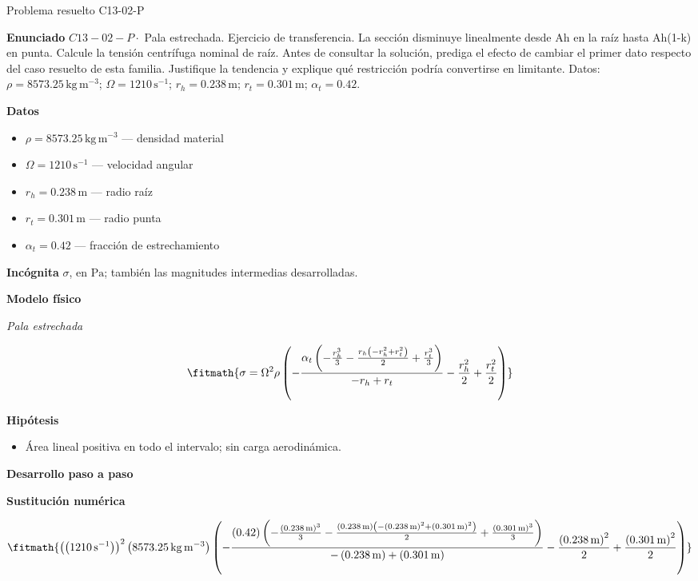 \documentclass[10pt,openany]{book}
\begin{document}
\begin{studiumworked}{Problema resuelto C13-02-P}


\noindent\textbf{Enunciado}
\(C13-02-P \cdot\) Pala estrechada. Ejercicio de transferencia. La sección disminuye linealmente desde Ah en la raíz hasta Ah(1-k) en punta. Calcule la tensión centrífuga nominal de raíz. Antes de consultar la solución, prediga el efecto de cambiar el primer dato respecto del caso resuelto de esta familia. Justifique la tendencia y explique qué restricción podría convertirse en limitante. Datos: \(\rho=8573.25\, \mathrm{kg}\,\mathrm{m}^{-3}\); \(\Omega=1210\, \mathrm{s}^{-1}\); \(r_h=0.238\, \mathrm{m}\); \(r_t=0.301\, \mathrm{m}\); \(\alpha_t=0.42\).

\noindent\textbf{Datos}
\begin{itemize}
\item $\rho = 8573.25\,\mathrm{kg}\,\mathrm{m}^{-3}$ — densidad material
\item $\Omega = 1210\,\mathrm{s}^{-1}$ — velocidad angular
\item $r_h = 0.238\,\mathrm{m}$ — radio raíz
\item $r_t = 0.301\,\mathrm{m}$ — radio punta
\item $\alpha_t = 0.42$ — fracción de estrechamiento
\end{itemize}

\noindent\textbf{Incógnita}
$\sigma$, en $\mathrm{Pa}$; también las magnitudes intermedias desarrolladas.

\noindent\textbf{Modelo físico}

\noindent\textit{Pala estrechada}

\[
\fitmath{\sigma=\Omega^{2} \rho \left(- \frac{\alpha_t \left(- \frac{r_h^{3}}{3} - \frac{r_h \left(- r_h^{2} + r_t^{2}\right)}{2} + \frac{r_t^{3}}{3}\right)}{- r_h + r_t} - \frac{r_h^{2}}{2} + \frac{r_t^{2}}{2}\right)}
\]

\noindent\textbf{Hipótesis}
\begin{itemize}
\item Área lineal positiva en todo el intervalo; sin carga aerodinámica.
\end{itemize}

\noindent\textbf{Desarrollo paso a paso}



\noindent\textbf{Sustitución numérica}

\[
\fitmath{\left(\left(1210\,\mathrm{s}^{-1}\right)\right)^{2} \left(8573.25\,\mathrm{kg}\,\mathrm{m}^{-3}\right) \left(- \frac{\left(0.42\right) \left(- \frac{\left(0.238\,\mathrm{m}\right)^{3}}{3} - \frac{\left(0.238\,\mathrm{m}\right) \left(- \left(0.238\,\mathrm{m}\right)^{2} + \left(0.301\,\mathrm{m}\right)^{2}\right)}{2} + \frac{\left(0.301\,\mathrm{m}\right)^{3}}{3}\right)}{- \left(0.238\,\mathrm{m}\right) + \left(0.301\,\mathrm{m}\right)} - \frac{\left(0.238\,\mathrm{m}\right)^{2}}{2} + \frac{\left(0.301\,\mathrm{m}\right)^{2}}{2}\right)}
\]


\end{studiumworked}
\end{document}
